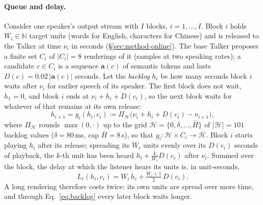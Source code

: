 \paragraph{Queue and delay.} Consider one speaker's output stream with $I$ blocks, $i=1,\dots,I$. Block $i$ holds
$W_i\in\mathbb{N}$ target units (words for English, characters for Chinese) and is released to the Talker at time
$\nu_i$ in seconds (\S\ref{sec:method-online}). The base Talker proposes a finite set $C_i$ of $|C_i|=8$ renderings of
it (samples at two speaking rates); a candidate $c\in C_i$ is a sequence $\bm{a}(c)$ of semantic tokens and lasts
$D(c)=0.02\,|\bm{a}(c)|$ seconds. Let the \emph{backlog} $h_i$ be how many seconds block $i$ waits after $\nu_i$ for
earlier speech of its speaker. The first block does not wait, $h_1=0$, and block $i$ ends at $\nu_i+h_i+D(c_i)$, so the
next block waits for whatever of that remains at its own release:
\begin{equation}
h_{i+1}=g_i(h_i,c_i)\coloneqq\Pi_{\mathcal{H}}\big(\nu_i+h_i+D(c_i)-\nu_{i+1}\big),\!
\label{eq:backlog}
\end{equation}
where $\Pi_{\mathcal{H}}$ rounds $\max(0,\cdot)$ up to the grid $\mathcal{H}=\{0,\delta,\dots,\bar{H}\}$ of
$|\mathcal{H}|=101$ backlog values ($\delta=80$\,ms, cap $\bar{H}=8$\,s), so that
$g_i:\mathcal{H}\times C_i\to\mathcal{H}$. Block $i$ starts playing $h_i$ after its release; spreading its $W_i$ units
evenly over its $D(c_i)$ seconds of playback, the $k$-th unit has been heard $h_i+\frac{k}{W_i}D(c_i)$ after $\nu_i$.
Summed over the block, the delay at which the listener hears its units is, in unit-seconds,
\begin{equation}
L_i(h_i,c_i)=W_i\,h_i+\tfrac{W_i+1}{2}\,D(c_i).
\label{eq:lat}
\end{equation}
A long rendering therefore costs twice: its own units are spread over more time, and through Eq.~\eqref{eq:backlog}
every later block waits longer.

